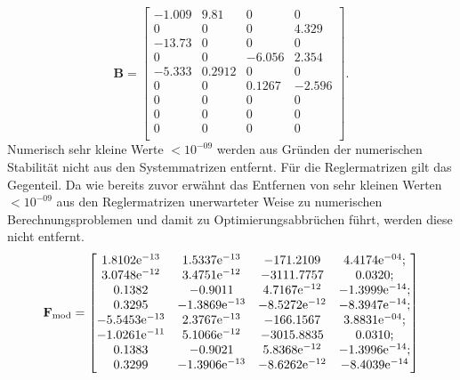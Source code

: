 \begin{equation*}
\textbf{B} = \begin{bmatrix}
-1.009 & 9.81 & 0 & 0\\ 0 & 0 & 0 & 4.329\\ -13.73 & 0 & 0 & 0\\ 0 & 0 & -6.056 & 2.354\\ -5.333 & 0.2912 & 0 & 0\\ 0 & 0 & 0.1267 & -2.596\\ 0 & 0 & 0 & 0\\ 0 & 0 & 0 & 0\\ 0 & 0 & 0 & 0 \\
\end{bmatrix}.
\end{equation*}
Numerisch sehr kleine Werte $<10^{-09}$ werden aus Gründen der numerischen Stabilität nicht aus den Systemmatrizen entfernt. Für die Reglermatrizen gilt das Gegenteil. Da wie bereits zuvor erwähnt das Entfernen von sehr kleinen Werten $<10^{-09}$ aus den Reglermatrizen unerwarteter Weise zu numerischen Berechnungsproblemen und damit zu Optimierungsabbrüchen führt, werden diese nicht entfernt.
\begin{equation*}
{\ensuremath{\boldsymbol{\mathrm{F}}}}_{\textnormal{mod}} = 
\begin{bmatrix}
1.8102\mathrm{e}^{-13} & 1.5337\mathrm{e}^{-13} & -171.2109 & 4.4174\mathrm{e}^{-04}; \\
3.0748\mathrm{e}^{-12} & 3.4751\mathrm{e}^{-12} & -3111.7757 & 0.0320; \\
0.1382 & -0.9011 & 4.7167\mathrm{e}^{-12} & -1.3999\mathrm{e}^{-14}; \\
0.3295 & -1.3869\mathrm{e}^{-13} & -8.5272\mathrm{e}^{-12} & -8.3947\mathrm{e}^{-14}; \\
-5.5453\mathrm{e}^{-13} & 2.3767\mathrm{e}^{-13} & -166.1567 & 3.8831\mathrm{e}^{-04}; \\
-1.0261\mathrm{e}^{-11} & 5.1066\mathrm{e}^{-12} & -3015.8835 & 0.0310; \\
0.1383 & -0.9021 & 5.8368\mathrm{e}^{-12} & -1.3996\mathrm{e}^{-14}; \\
0.3299 & -1.3906\mathrm{e}^{-13} & -8.6262\mathrm{e}^{-12} & -8.4039\mathrm{e}^{-14}
\end{bmatrix}
\end{equation*}

